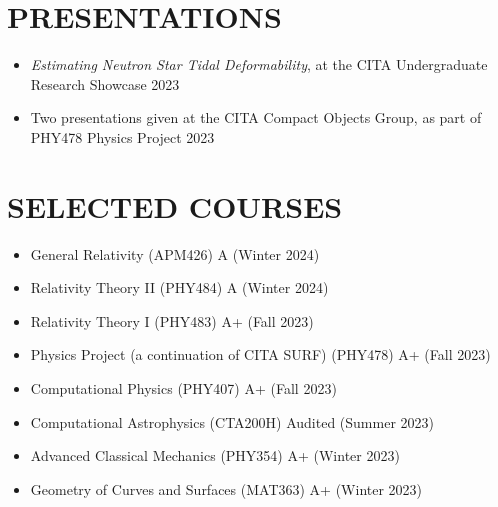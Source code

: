 \documentclass[a4paper,10pt]{extarticle}
\begin{document}
\section*{PRESENTATIONS}
\begin{itemize}
    \item \textit{Estimating Neutron Star Tidal Deformability}, at the CITA Undergraduate Research Showcase \hfill 2023

    \item Two presentations given at the CITA Compact Objects Group, as part of PHY478 Physics Project \hfill 2023
\end{itemize}

\section*{SELECTED COURSES}
\begin{itemize}
    \item General Relativity (APM426) \hfill A (Winter 2024)
    
    \item Relativity Theory II (PHY484) \hfill A (Winter 2024)

    \item Relativity Theory I (PHY483) \hfill A+ (Fall 2023)

    \item Physics Project (a continuation of CITA SURF) (PHY478) \hfill A+ (Fall 2023)

    \item Computational Physics (PHY407) \hfill A+ (Fall 2023)

    \item Computational Astrophysics (CTA200H) \hfill Audited (Summer 2023)

    \item Advanced Classical Mechanics (PHY354) \hfill A+ (Winter 2023)

    \item Geometry of Curves and Surfaces (MAT363) \hfill A+ (Winter 2023)
\end{itemize}
\end{document}
